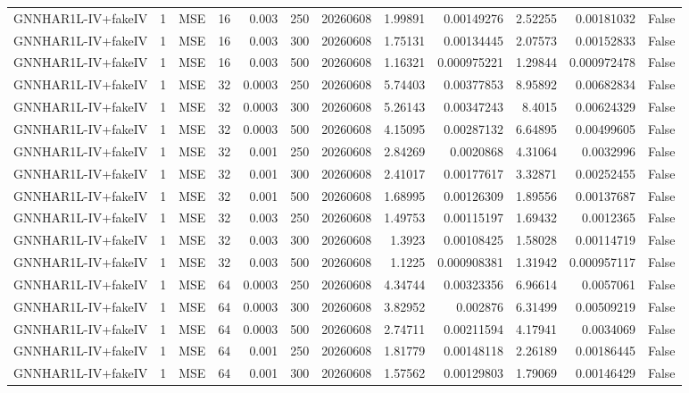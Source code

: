 \begin{tabular}{lrlrrrrrrrrr}
GNNHAR1L-IV+fakeIV & 1 & MSE & 16 & 0.003 & 250 & 20260608 & 1.99891 & 0.00149276 & 2.52255 & 0.00181032 & False \\
GNNHAR1L-IV+fakeIV & 1 & MSE & 16 & 0.003 & 300 & 20260608 & 1.75131 & 0.00134445 & 2.07573 & 0.00152833 & False \\
GNNHAR1L-IV+fakeIV & 1 & MSE & 16 & 0.003 & 500 & 20260608 & 1.16321 & 0.000975221 & 1.29844 & 0.000972478 & False \\
GNNHAR1L-IV+fakeIV & 1 & MSE & 32 & 0.0003 & 250 & 20260608 & 5.74403 & 0.00377853 & 8.95892 & 0.00682834 & False \\
GNNHAR1L-IV+fakeIV & 1 & MSE & 32 & 0.0003 & 300 & 20260608 & 5.26143 & 0.00347243 & 8.4015 & 0.00624329 & False \\
GNNHAR1L-IV+fakeIV & 1 & MSE & 32 & 0.0003 & 500 & 20260608 & 4.15095 & 0.00287132 & 6.64895 & 0.00499605 & False \\
GNNHAR1L-IV+fakeIV & 1 & MSE & 32 & 0.001 & 250 & 20260608 & 2.84269 & 0.0020868 & 4.31064 & 0.0032996 & False \\
GNNHAR1L-IV+fakeIV & 1 & MSE & 32 & 0.001 & 300 & 20260608 & 2.41017 & 0.00177617 & 3.32871 & 0.00252455 & False \\
GNNHAR1L-IV+fakeIV & 1 & MSE & 32 & 0.001 & 500 & 20260608 & 1.68995 & 0.00126309 & 1.89556 & 0.00137687 & False \\
GNNHAR1L-IV+fakeIV & 1 & MSE & 32 & 0.003 & 250 & 20260608 & 1.49753 & 0.00115197 & 1.69432 & 0.0012365 & False \\
GNNHAR1L-IV+fakeIV & 1 & MSE & 32 & 0.003 & 300 & 20260608 & 1.3923 & 0.00108425 & 1.58028 & 0.00114719 & False \\
GNNHAR1L-IV+fakeIV & 1 & MSE & 32 & 0.003 & 500 & 20260608 & 1.1225 & 0.000908381 & 1.31942 & 0.000957117 & False \\
GNNHAR1L-IV+fakeIV & 1 & MSE & 64 & 0.0003 & 250 & 20260608 & 4.34744 & 0.00323356 & 6.96614 & 0.0057061 & False \\
GNNHAR1L-IV+fakeIV & 1 & MSE & 64 & 0.0003 & 300 & 20260608 & 3.82952 & 0.002876 & 6.31499 & 0.00509219 & False \\
GNNHAR1L-IV+fakeIV & 1 & MSE & 64 & 0.0003 & 500 & 20260608 & 2.74711 & 0.00211594 & 4.17941 & 0.0034069 & False \\
GNNHAR1L-IV+fakeIV & 1 & MSE & 64 & 0.001 & 250 & 20260608 & 1.81779 & 0.00148118 & 2.26189 & 0.00186445 & False \\
GNNHAR1L-IV+fakeIV & 1 & MSE & 64 & 0.001 & 300 & 20260608 & 1.57562 & 0.00129803 & 1.79069 & 0.00146429 & False \\

\end{tabular}
